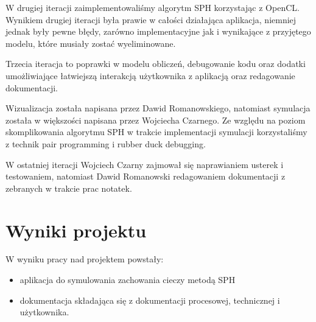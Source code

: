 \documentclass[polish, 12pt]{aghthesis}
\begin{document}
	W drugiej iteracji zaimplementowaliśmy algorytm SPH korzystając z OpenCL. Wynikiem drugiej iteracji była prawie w całości działająca aplikacja, niemniej jednak były pewne błędy, zarówno implementacyjne jak i wynikające z przyjętego modelu, które musiały zostać wyeliminowane.

	Trzecia iteracja to poprawki w modelu obliczeń, debugowanie kodu oraz dodatki umożliwiające łatwiejszą interakcją użytkownika z aplikacją oraz redagowanie dokumentacji.

	Wizualizacja została napisana przez Dawid Romanowskiego, natomiast symulacja została w większości napisana przez Wojciecha Czarnego. Ze względu na poziom skomplikowania algorytmu SPH w trakcie implementacji symulacji korzystaliśmy z technik pair programming i rubber duck debugging.

	W ostatniej iteracji Wojciech Czarny zajmował się naprawianiem usterek i testowaniem, natomiast Dawid Romanowski redagowaniem dokumentacji z zebranych w trakcie prac notatek.

\section{Wyniki projektu}

	W wyniku pracy nad projektem powstały:
	\begin{itemize}
	\item aplikacja do symulowania zachowania cieczy metodą SPH
	\item dokumentacja składająca się z dokumentacji procesowej, technicznej i użytkownika.
	\end{itemize}

	
\end{document}
